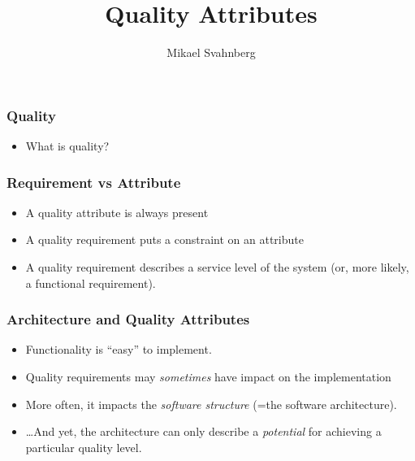 \documentclass[10pt]{beamer}
\title[]{Quality Attributes}
\author[Mikael Svahnberg]{Mikael Svahnberg\inst{1}}
\institute[BTH] %
{
  \inst{1}%
 Mikael.Svahnberg?bth.se\\
 School of Computing\\
 Blekinge Institute of Technology%
}
\begin{document}
\begin{frame}
  \titlepage
\end{frame}



\begin{frame}[t]
\frametitle{Quality}

\begin{itemize}
\item What is quality?
\end{itemize}

\end{frame}

\begin{frame}[t]
\frametitle{Requirement vs Attribute}
\begin{itemize}
\item A quality attribute is always present
\item A quality requirement puts a constraint on an attribute
\item A quality requirement describes a service level of the system (or, more likely, a functional requirement).
\end{itemize}
\end{frame}

\begin{frame}[t]
\frametitle{Architecture and Quality Attributes}
\begin{itemize}
\item Functionality is ``easy'' to implement.
\item Quality requirements may \emph{sometimes} have impact on the implementation
\item More often, it impacts the \emph{software structure} (=the software architecture).
\item \ldots And yet, the architecture can only describe a \emph{potential} for achieving a particular quality level.
\end{itemize}
\end{frame}
\end{document}
